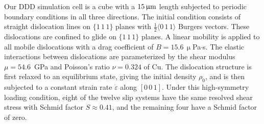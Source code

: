 \documentclass[%
reprint,
 amsmath,amssymb,
 aps,
superscriptaddress,
]{revtex4-1}
\begin{document}
Our DDD simulation cell is a cube with a $15\,\upmu{\rm m}$ length subjected to
periodic boundary conditions in all three directions. 
%
The initial condition consists of straight dislocation lines on $\{1\,1\,1\}$
planes with $\frac{1}{2}\langle 0\,1\,1\rangle$ Burgers vectors. These
dislocations are confined to glide on $\{1\,1\,1\}$ planes. 
%
A linear mobility is applied to all mobile dislocations with a drag coefficient
of $B = 15.6\,\upmu$Pa$\cdot$s. 
%
The elastic interactions between dislocations are parameterized by the
shear modulus $\mu = 54.6$~GPa and Poisson's ratio $\nu = 0.324$ of Cu. 
%
The dislocation structure is first relaxed to an equilibrium state, giving the
initial density $\rho_0$, and is then subjected to a constant strain rate
$\dot{\varepsilon}$ along $[0\,0\,1]$. 
%
%
Under this high-symmetry loading condition, eight of the twelve slip systems 
have the same resolved shear stress with Schmid factor $S\approx0.41$, and 
the remaining four have a Schmid factor of zero.
%
\end{document}
